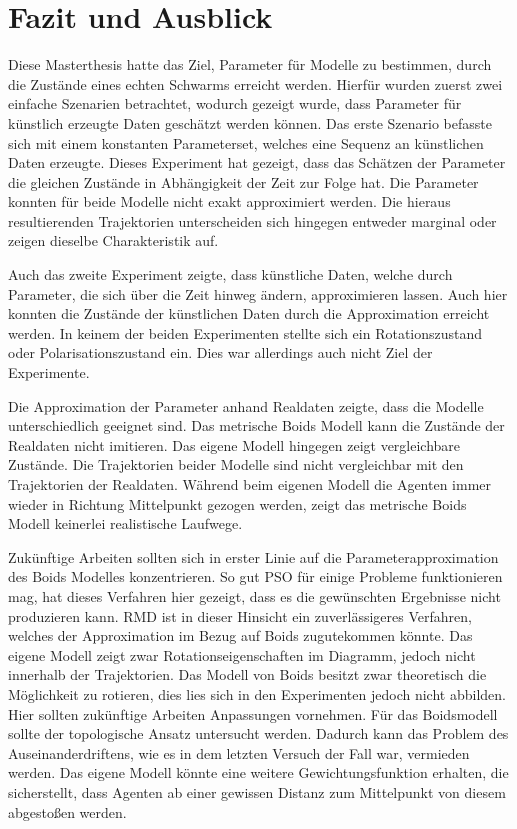 
\chapter{Fazit und Ausblick} %
\label{cha:chapter_name}

Diese Masterthesis hatte das Ziel, Parameter für Modelle zu bestimmen, durch die Zustände eines echten Schwarms erreicht werden.
Hierfür wurden zuerst zwei einfache Szenarien betrachtet, wodurch gezeigt wurde, dass Parameter für künstlich erzeugte Daten geschätzt werden können. Das erste Szenario befasste sich mit einem konstanten Parameterset, welches eine Sequenz an künstlichen Daten erzeugte. Dieses Experiment hat gezeigt, dass das Schätzen der Parameter die gleichen Zustände in Abhängigkeit der Zeit zur Folge hat. Die Parameter konnten für beide Modelle nicht exakt approximiert werden. Die hieraus resultierenden Trajektorien unterscheiden sich hingegen entweder marginal oder zeigen dieselbe Charakteristik auf.

Auch das zweite Experiment zeigte, dass künstliche Daten, welche durch Parameter, die sich über die Zeit hinweg ändern, approximieren lassen. Auch hier konnten die Zustände der künstlichen Daten durch die Approximation erreicht werden. In keinem der beiden Experimenten stellte sich ein Rotationszustand oder Polarisationszustand ein. Dies war allerdings auch nicht Ziel der Experimente.

Die Approximation der Parameter anhand Realdaten zeigte, dass die Modelle unterschiedlich geeignet sind. Das metrische Boids Modell kann die Zustände der Realdaten nicht imitieren. Das eigene Modell hingegen zeigt vergleichbare Zustände. Die Trajektorien beider Modelle sind nicht vergleichbar mit den Trajektorien der Realdaten. Während beim eigenen Modell die Agenten immer wieder in Richtung Mittelpunkt gezogen werden, zeigt das metrische Boids Modell keinerlei realistische Laufwege.

Zukünftige Arbeiten sollten sich in erster Linie auf die Parameterapproximation des Boids Modelles konzentrieren. So gut PSO für einige Probleme funktionieren mag, hat dieses Verfahren hier gezeigt, dass es die gewünschten Ergebnisse nicht produzieren kann. 
RMD ist in dieser Hinsicht ein zuverlässigeres Verfahren, welches der Approximation im Bezug auf Boids zugutekommen könnte.
Das eigene Modell zeigt zwar Rotationseigenschaften im Diagramm, jedoch nicht innerhalb der Trajektorien. Das Modell von Boids besitzt zwar theoretisch die Möglichkeit zu rotieren, dies lies sich in den Experimenten jedoch nicht abbilden.
Hier sollten zukünftige Arbeiten Anpassungen vornehmen. Für das Boidsmodell sollte der topologische Ansatz untersucht werden.
Dadurch kann das Problem des Auseinanderdriftens, wie es in dem letzten Versuch der Fall war, vermieden werden.
Das eigene Modell könnte eine weitere Gewichtungsfunktion erhalten, die sicherstellt, dass Agenten ab einer gewissen Distanz zum Mittelpunkt von diesem abgestoßen werden.

